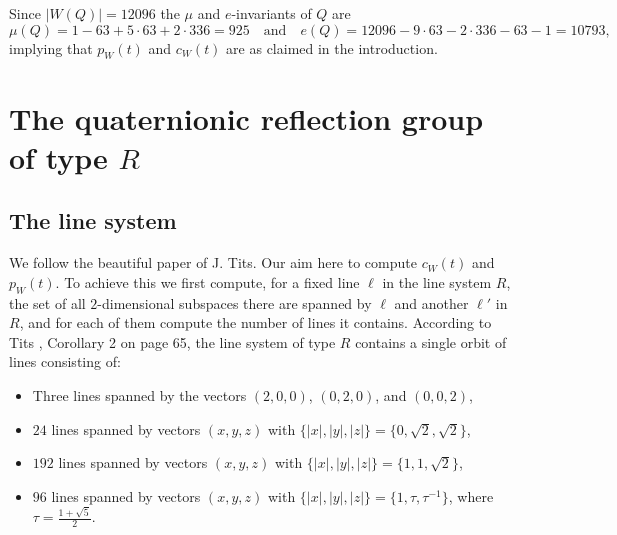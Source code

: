 \documentclass[11pt, reqno]{amsart}
\numberwithin{equation}{section}
\theoremstyle{definition}
\theoremstyle{plain}
\begin{document}
Since $|W(Q)|=12096$ the $\mu$ and $e$-invariants of $Q$ are
$$\mu(Q)=1-63+5 \cdot 63+2 \cdot 336=925 \quad \text{and} \quad e(Q)=12096-9 \cdot 63-2 \cdot 336-63-1=10793,$$ implying that $p_W(t)$ and $c_W(t)$ are as claimed in the introduction.

\section{The quaternionic reflection group of type $R$} 

\subsection{The line system} We follow the beautiful paper \cite{Tit} of J. Tits. Our aim here to compute $c_W(t)$ and $p_W(t)$. To achieve this we first compute, for a fixed line $\ell$ in the line system $R$, the set of all $2$-dimensional subspaces there are spanned by $\ell$ and another $\ell'$ in $R$, and for each of them compute the number of lines it contains. According to Tits \cite{Tit}, Corollary 2 on page 65, the line system of type $R$ contains a single orbit of lines consisting of: 
\begin{itemize}
\item[(a)] Three lines spanned by the vectors $(2,0,0)$, $(0,2,0)$, and $(0,0,2)$,
\item[(b)] $24$ lines spanned by vectors $(x,y,z)$ with $\{|x|, |y|,|z| \}=\{0,\sqrt{2},\sqrt{2} \}$,
\item[(c)] $192$ lines spanned by vectors $(x,y,z)$ with $\{|x|, |y|,|z| \}=\{1,1,\sqrt{2} \}$,
\item[(d)] $96$ lines spanned by vectors $(x,y,z)$ with $\{|x|, |y|,|z| \}=\{1,\tau,\tau^{-1} \}$, where $\tau=\frac{1+\sqrt{5}}{2}$.
\end{itemize}
\end{document}
